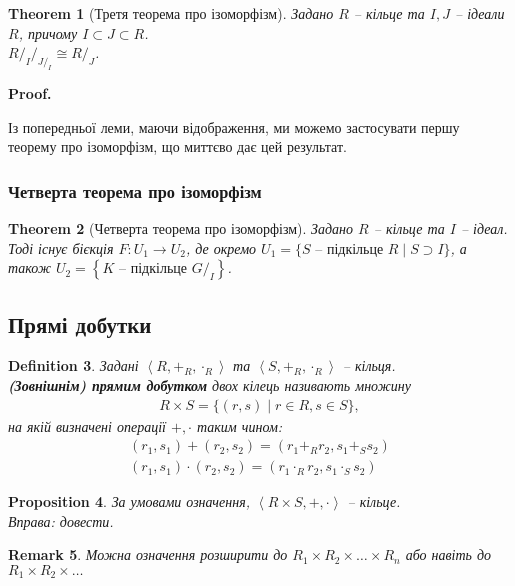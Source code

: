 \documentclass[a4paper, 10pt]{article}
\makeatletter
\theoremstyle{theoremdd}
\newtheorem{theorem}{Theorem}[subsection]
\theoremstyle{theoremdd}
\newtheorem{definition}[theorem]{Definition}
\theoremstyle{theoremdd}
\theoremstyle{theoremdd}
\theoremstyle{theoremdd}
\theoremstyle{theoremdd}
\theoremstyle{theoremdd}
\theoremstyle{theoremdd}
\theoremstyle{theoremdd}
\newtheorem{proposition}[theorem]{Proposition}
\theoremstyle{theoremdd}
\theoremstyle{theoremdd}
\newtheorem{remark}[theorem]{Remark}
\theoremstyle{theoremdd}
\theoremstyle{theoremdd}
\theoremstyle{theoremdd}
\theoremstyle{theoremdd}
\renewenvironment{proof}[1][Proof.\\]{\par
\pushQED{\hfill \qed}%
\normalfont \topsep6\p@\@plus6\p@\relax
\trivlist
\item\relax
{\bfseries
#1\@addpunct{.}}\hspace\labelsep\ignorespaces
}{%
\popQED\endtrivlist\@endpefalse
}
\makeatother
\begin{document}
\begin{theorem}[Третя теорема про ізоморфізм]
Задано $R$ -- кільце та $I,J$ -- ідеали $R$, причому $I \subset J \subset R$.\\
${R/_I}/_{J/_I} \cong R/_J$.
\end{theorem}

\begin{proof}
Із попередньої леми, маючи відображення, ми можемо застосувати першу теорему про ізоморфізм, що миттєво дає цей результат.
\end{proof}

\subsubsection{Четверта теорема про ізоморфізм}
\begin{theorem}[Четверта теорема про ізоморфізм]
Задано $R$ -- кільце та $I$ -- ідеал. Тоді існує бієкція $F \colon U_1 \to U_2$, де окремо $U_1 = \{ S \text{ -- підкільце } R \mid S \supset I\}$, а також $U_2 = \left\{ K \text{ -- підкільце } G/_I\right\}$.
\end{theorem}

\subsection{Прямі добутки}
\begin{definition}
Задані $\left<R, +_R, \cdot_R \right>$ та $\left<S, +_R, \cdot_R \right>$ -- кільця.\\
\textbf{(Зовнішнім) прямим добутком} двох кілець називають множину
\begin{align*}
R \times S = \{(r,s) \mid r \in R, s \in S\},
\end{align*}
на якій визначені операції $+,\cdot$ таким чином:
\begin{align*}
(r_1,s_1) + (r_2,s_2) = (r_1+_R r_2, s_1 +_S s_2) \\
(r_1,s_1) \cdot (r_2,s_2) = (r_1 \cdot_R r_2, s_1 \cdot_S s_2)
\end{align*}
\end{definition}

\begin{proposition}
За умовами означення, $\left< R \times S, +, \cdot \right>$ -- кільце.\\
\textit{Вправа: довести.}
\end{proposition}

\begin{remark}
Можна означення розширити до $R_1 \times R_2 \times \dots \times R_n$ або навіть до $R_1 \times R_2 \times \dots$
\end{remark}
\end{document}
